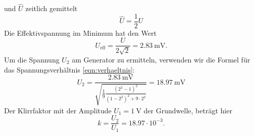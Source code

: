 und $\hat{U}$ zeitlich gemittelt
\begin{equation*}
  \hat{U} = \frac{1}{2} U
\end{equation*}
Die Effektivspannung im Minimum hat den Wert
\begin{equation*}
  U_\text{eff} = \frac{U}{2 \sqrt{2}} = \SI{2.83}{\milli \volt}.
\end{equation*}
Um die Spannung $U_2$ am Generator zu ermitteln, verwenden wir die Formel für das Spannungsverhältnis \eqref{eqn:verhaeltnis}:
\begin{equation*}
  U_2 = \frac{\SI{2.83}{\milli\volt}}{\sqrt{\frac{1}{9} \frac{(2^2-1)^2}{(1-2^2)^2+9\cdot 2^2}}} = \SI{18.97}{\milli \volt}
\end{equation*}
Der Klirrfaktor mit der Amplitude $U_1=\SI{1}{\volt}$ der Grundwelle, beträgt hier
\begin{equation*}
  k = \frac{U_2}{U_1} = 18.97 \cdot 10^{-3}.
\end{equation*}